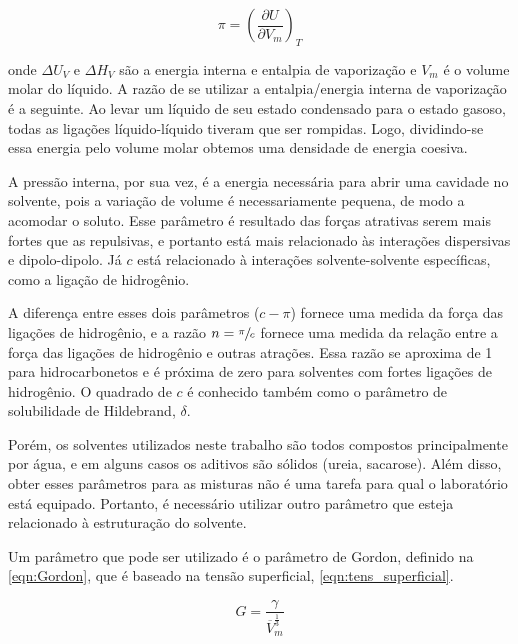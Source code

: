 		\begin{equation}
			\pi = \left( \dfrac{\partial U}{\partial V_m} \right)_T
			\label{eqn:pressao_interna}
		\end{equation}
		
		\noindent onde \(\Delta U_V\) e \(\Delta H_V\) são a energia interna e entalpia de vaporização e \(V_m\) é o volume molar do líquido. A razão de se utilizar a entalpia/energia interna de vaporização é a seguinte. Ao levar um líquido de seu estado condensado para o estado gasoso, todas as ligações líquido-líquido tiveram que ser rompidas. Logo, dividindo-se essa energia pelo volume molar obtemos uma densidade de energia coesiva.
		
		A pressão interna, por sua vez, é a energia necessária para abrir uma cavidade no solvente, pois a variação de volume é necessariamente pequena, de modo a acomodar o soluto. Esse parâmetro é resultado das forças atrativas serem mais fortes que as repulsivas, e portanto está mais relacionado às interações dispersivas e dipolo-dipolo. Já \(c\) está relacionado à interações solvente-solvente específicas, como a ligação de hidrogênio.
		
		A diferença entre esses dois parâmetros (\(c - \pi\)) fornece uma medida da força das ligações de hidrogênio, e a razão \(n = \sfrac{\pi}{c}\) fornece uma medida da relação entre a força das ligações de hidrogênio e outras atrações. Essa razão se aproxima de 1 para hidrocarbonetos e é próxima de zero para solventes com fortes ligações de hidrogênio. O quadrado de \(c\) é conhecido também como o parâmetro de solubilidade de Hildebrand, \(\delta\).
		
		Porém, os solventes utilizados neste trabalho são todos compostos principalmente por água, e em alguns casos os aditivos são sólidos (ureia, sacarose). Além disso, obter esses parâmetros para as misturas não é uma tarefa para qual o laboratório está equipado. Portanto, é necessário utilizar outro parâmetro que esteja relacionado à estruturação do solvente.
		
		Um parâmetro que pode ser utilizado é o parâmetro de Gordon, definido na \autoref{eqn:Gordon}, que é baseado na tensão superficial, \autoref{eqn:tens_superficial}. %

		\begin{equation}
			G = \dfrac{\gamma}{\overline{V}_m^{\frac{1}{3}}}
			\label{eqn:Gordon}
		\end{equation}
		
